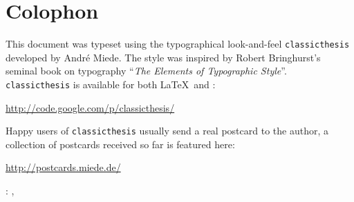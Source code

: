 \thispagestyle{empty}

\hfill

\vfill

\section*{Colophon}
This document was typeset using the typographical look-and-feel
\texttt{classicthesis} developed by Andr\'e Miede.
The style was inspired by Robert Bringhurst's seminal book on
typography ``\emph{The Elements of Typographic Style}''.
\texttt{classicthesis} is available for both \LaTeX\ and \mLyX: 
\begin{center}
\url{http://code.google.com/p/classicthesis/}
\end{center}
Happy users of \texttt{classicthesis} usually send a real postcard
to the author, a collection of postcards received so far is
featured here:
\begin{center}
\url{http://postcards.miede.de/}
\end{center}
 
\bigskip

\noindent\myFirstAuthorName:
\textit{\myTitleIT},
\myTime

\medskip

